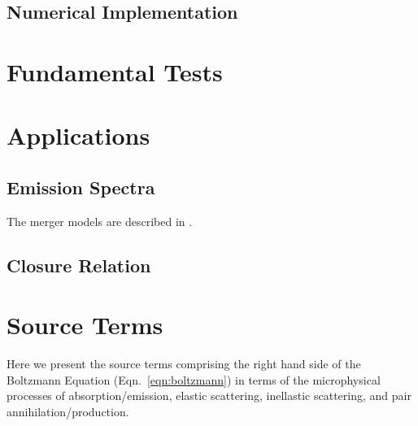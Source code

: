 \documentclass[aps,prd,twocolumn,superscriptaddress,groupedaddress]{revtex4}
\begin{document}
\subsection{Numerical Implementation}
\label{sec:numerical}

\section{Fundamental Tests}
\label{sec:tests}

\section{Applications}
\label{sec:applications}

\subsection{Emission Spectra}
\label{ssec:spectra}
The merger models are described in \cite{fouc2015-m1_nsbh,fouc2016-m1_nsns}.

\subsection{Closure Relation}
\label{ssec:closure}

\appendix

\section{Source Terms}
\label{sec:source_terms}
Here we present the source terms comprising the right hand side of the
Boltzmann Equation (Eqn.~\ref{eqn:boltzmann}) in terms of the microphysical
processes of absorption/emission, elastic scattering, inellastic scattering,
and pair annihilation/production.


\end{document}
